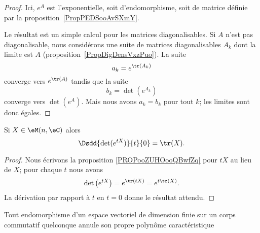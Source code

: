 \begin{proof}
	Ici, \( e^A\) est l'exponentielle, soit d'endomorphisme, soit de matrice définie par la proposition~\ref{PropPEDSooAvSXmY}.

	Le résultat est un simple calcul pour les matrices diagonalisables. Si \( A\) n'est pas diagonalisable, nous considérons une suite de matrices diagonalisables \( A_k\) dont la limite est \( A\) (proposition~\ref{PropDigDensVxzPuo}). La suite
	\begin{equation}
		a_k= e^{\tr(A_k)}
	\end{equation}
	converge vers \(  e^{\tr(A)}\) tandis que la suite
	\begin{equation}
		b_k=\det( e^{A_k})
	\end{equation}
	converge vers \( \det( e^{A})\). Mais nous avons \( a_k=b_k\) pour tout \( k\); les limites sont donc égales.
\end{proof}

\begin{corollary}       \label{CORooOKKSooHrsYOs}
	Si \( X\in\eM(n,\eC)\) alors
	\begin{equation}
		\Dsdd{ \det( e^{tX}) }{t}{0}=\tr(X).
	\end{equation}
\end{corollary}

\begin{proof}
	Nous écrivons la proposition \ref{PROPooZUHOooQBwfZq} pour \( tX\) au lieu de \( X\); pour chaque \( t\) nous avons
	\begin{equation}
		\det\big(  e^{tX} \big)= e^{\tr(tX)}= e^{t\tr(X)}.
	\end{equation}
	La dérivation par rapport à \( t\) en \( t=0\) donne le résultat attendu.
\end{proof}

\begin{theorem}  \label{ThoHZTooWDjTYI}
	Tout endomorphisme d'un espace vectoriel de dimension finie sur un corps commutatif quelconque annule son propre polynôme caractéristique
\end{theorem}


